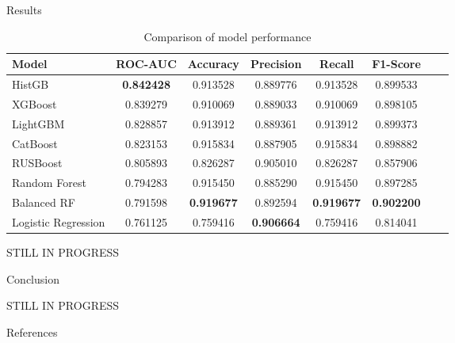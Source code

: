 \documentclass[final]{beamer}
\newlength{\sepwidth}
\newlength{\colwidth}
\newcommand{\separatorcolumn}{\begin{column}{\sepwidth}\end{column}}
\begin{document}
\begin{frame}[t]
\begin{columns}[t]
\begin{column}{\colwidth}
\begin{exampleblock}{Results}
    \begin{table}[H]
    \centering
    \begin{tabular}{|l|c|c|c|c|c|c|c|}
        \hline
        Model & ROC-AUC & Accuracy & Precision & Recall & F1-Score \\
        \hline

        HistGB & \textbf{0.842428} & 0.913528 & 0.889776 & 0.913528 & 0.899533 \\
        XGBoost & 0.839279 & 0.910069 & 0.889033 & 0.910069 & 0.898105 \\
        LightGBM & 0.828857 & 0.913912 & 0.889361 & 0.913912 & 0.899373 \\
        CatBoost & 0.823153 & 0.915834 & 0.887905 & 0.915834 & 0.898882 \\
        RUSBoost & 0.805893 & 0.826287 & 0.905010 & 0.826287 & 0.857906 \\
        Random Forest & 0.794283 & 0.915450 & 0.885290 & 0.915450 & 0.897285 \\
        Balanced RF & 0.791598 & \textbf{0.919677} & 0.892594 & \textbf{0.919677} & \textbf{0.902200} \\
        Logistic Regression & 0.761125 & 0.759416 & \textbf{0.906664} & 0.759416 & 0.814041 \\
        \hline
    \end{tabular}
    \caption{Comparison of model performance}
    \end{table}

    STILL IN PROGRESS

  \end{exampleblock}

  \begin{block}{Conclusion}

    STILL IN PROGRESS

  \end{block}

  \begin{block}{References}

    \nocite{*}

  \end{block}

\end{column}

\separatorcolumn
\end{columns}
\end{frame}
\end{document}
